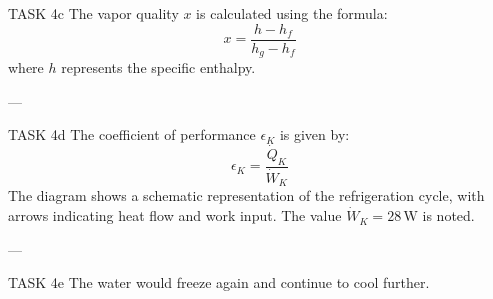 TASK 4c  
The vapor quality \( x \) is calculated using the formula:  
\[
x = \frac{h - h_f}{h_g - h_f}
\]  
where \( h \) represents the specific enthalpy.

---

TASK 4d  
The coefficient of performance \( \epsilon_K \) is given by:  
\[
\epsilon_K = \frac{\dot{Q}_K}{\dot{W}_K}
\]  
The diagram shows a schematic representation of the refrigeration cycle, with arrows indicating heat flow and work input. The value \( \dot{W}_K = 28 \, \text{W} \) is noted.

---

TASK 4e  
The water would freeze again and continue to cool further.